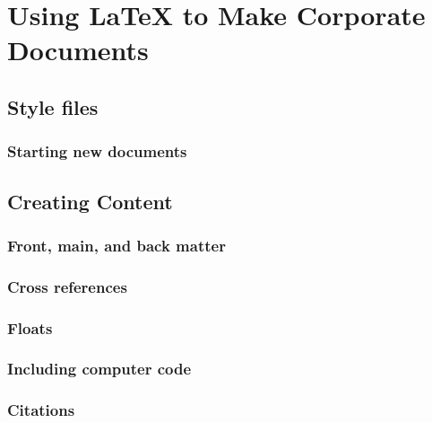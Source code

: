 \chapter{Using LaTeX to Make Corporate Documents }


\section{Style files}\label{sec:Corporatecls}


\subsection{Starting new documents}\label{sec:NewDocs}


\section{Creating Content}
\subsection{Front, main, and back matter}


\subsection{Cross references}


\subsection{Floats}


\subsection{Including computer code}\label{Sec:Codes}


\subsection{Citations}\label{Sec:Citations}



